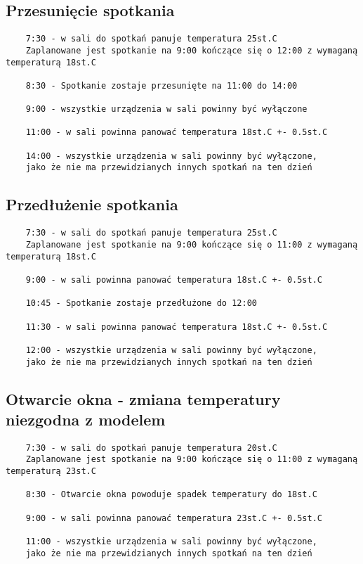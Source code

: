 \subsection{Przesunięcie spotkania}
\begin{lstlisting}
    7:30 - w sali do spotkań panuje temperatura 25st.C
    Zaplanowane jest spotkanie na 9:00 kończące się o 12:00 z wymaganą temperaturą 18st.C
        
    8:30 - Spotkanie zostaje przesunięte na 11:00 do 14:00

    9:00 - wszystkie urządzenia w sali powinny być wyłączone
    
    11:00 - w sali powinna panować temperatura 18st.C +- 0.5st.C
   
    14:00 - wszystkie urządzenia w sali powinny być wyłączone, 
    jako że nie ma przewidzianych innych spotkań na ten dzień
\end{lstlisting}

\subsection{Przedłużenie spotkania}
\begin{lstlisting}
    7:30 - w sali do spotkań panuje temperatura 25st.C
    Zaplanowane jest spotkanie na 9:00 kończące się o 11:00 z wymaganą temperaturą 18st.C
            
    9:00 - w sali powinna panować temperatura 18st.C +- 0.5st.C
    
    10:45 - Spotkanie zostaje przedłużone do 12:00
    
    11:30 - w sali powinna panować temperatura 18st.C +- 0.5st.C
   
    12:00 - wszystkie urządzenia w sali powinny być wyłączone, 
    jako że nie ma przewidzianych innych spotkań na ten dzień
\end{lstlisting}

\subsection{Otwarcie okna - zmiana temperatury niezgodna z modelem}
\begin{lstlisting}
    7:30 - w sali do spotkań panuje temperatura 20st.C
    Zaplanowane jest spotkanie na 9:00 kończące się o 11:00 z wymaganą temperaturą 23st.C

    8:30 - Otwarcie okna powoduje spadek temperatury do 18st.C 
    
    9:00 - w sali powinna panować temperatura 23st.C +- 0.5st.C

    11:00 - wszystkie urządzenia w sali powinny być wyłączone, 
    jako że nie ma przewidzianych innych spotkań na ten dzień
\end{lstlisting}
